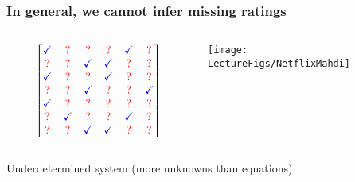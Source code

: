 \documentclass[compress,
mathserif,wide,%
]{beamer}
\begin{document}
\begin{frame}
\frametitle{In general, we cannot infer missing ratings}


\bigskip

\begin{columns}
\begin{column}{0.5\textwidth}
\[
 \begin{bmatrix}
   {\color{blue} \checkmark} & {\color{red} ?} &{\color{red} ?}  & {\color{red} ?} & {\color{blue} \checkmark} & {\color{red} ?} \\
   {\color{red} ?} & {\color{red} ?} & {\color{blue} \checkmark} & {\color{blue} \checkmark} & {\color{red} ?} & {\color{red} ?} \\
   {\color{blue} \checkmark} & {\color{red} ?} & {\color{red} ?} & {\color{blue} \checkmark} & {\color{red} ?} & {\color{red} ?} \\
   {\color{red} ?} & {\color{red} ?} & {\color{blue} \checkmark}  & {\color{red} ?} &{\color{red} ?}  & {\color{blue} \checkmark} \\
   {\color{blue} \checkmark}  &  {\color{red} ?} & {\color{red} ?} & {\color{red} ?}  & {\color{red} ?} & {\color{red} ?} \\
   {\color{red} ?} & {\color{blue} \checkmark} &{\color{red} ?}  & {\color{red} ?} & {\color{blue} \checkmark} & {\color{red} ?} \\
   {\color{red} ?}  &{\color{red} ?} & {\color{blue} \checkmark} &
   {\color{blue} \checkmark} & {\color{red} ?} & {\color{red} ?}
\end{bmatrix}
\]
\end{column}

\begin{column}{0.5\textwidth}  
\begin{center}
\texttt{[image: \\LectureFigs/NetflixMahdi]} \\
\end{center}
\end{column}

\end{columns}

\bigskip

\begin{center}
Underdetermined system (more unknowns than equations)
\end{center}


\end{frame}
\end{document}
